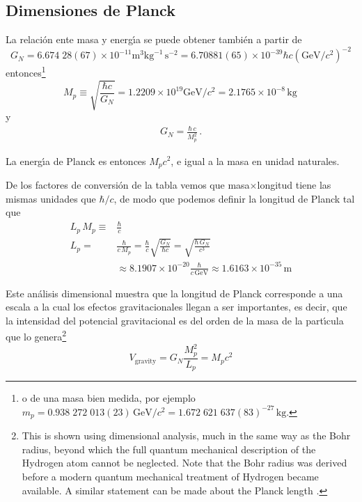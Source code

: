 \subsection{Dimensiones de Planck}


La relaci\'on ente masa y energ\'\i a se puede obtener también a partir de 
\begin{equation}
  G_N=6.674\;28(67)\times10^{-11}\text{m}^3\text{kg}^{-1}\,\text{s}^{-2}=6.70881(65)\times10^{-39}\hbar c(\text{GeV}/c^2)^{-2}
\end{equation}
entonces\footnote{o de una masa bien medida, por ejemplo
  $m_p=0.938\;272\;013(23)\,\text{GeV}/c^2=1.672\;621\;637(83)^{-27}\,\text{kg}.$
}
\begin{equation}
  M_p\equiv\sqrt{\frac{\hbar c}{G_N}}=1.2209\times10^{19}\text{GeV}/c^2=2.1765\times10^{-8}\,\text{kg}\,
\end{equation}
y
\begin{align}
  \label{eq:242}
  G_N=\frac{\hbar\,c}{M_p^2}\,.
\end{align}

La energ\'\i a de Planck es entonces $M_p c^2$, e igual a la masa en unidad naturales.


De los factores de conversi\'on de la tabla vemos que masa$\times$longitud tiene las mismas unidades que $\hbar/c$, de modo que podemos definir la longitud de Planck tal que
\begin{align}
  L_p\,M_p\equiv&\frac{\hbar}{c}\nonumber\\
  L_p=&\frac{\hbar}{c\,M_p}=\frac{\hbar}{c}\sqrt{\frac{G_N}{\hbar c}}=\sqrt{\frac{\hbar\, G_N}{c^3}}\nonumber\\
  &\approx8.1907\times10^{-20}\frac{\hbar}{c\,\text{GeV}} \approx1.6163\times10^{-35}\,\text{m}
\end{align}

Este an\'alisis dimensional muestra que la longitud de Planck corresponde a una escala a la cual los efectos gravitacionales llegan a ser importantes, es decir, que la intensidad del potencial gravitacional es del orden de la masa de la part\'\i cula que lo genera\footnote{This is shown using dimensional analysis, much in the same
way as the Bohr radius, beyond which the full quantum mechanical
description of the Hydrogen atom cannot be neglected. Note that the
Bohr radius was derived before a modern quantum mechanical treatment
of Hydrogen became available. A similar statement can be made about
the Planck length \cite{andim}.}
\begin{equation}
  \label{eq:241}
  V_{\text{gravity}}=G_N\frac{M_p^2}{L_p}=M_pc^2
\end{equation}


